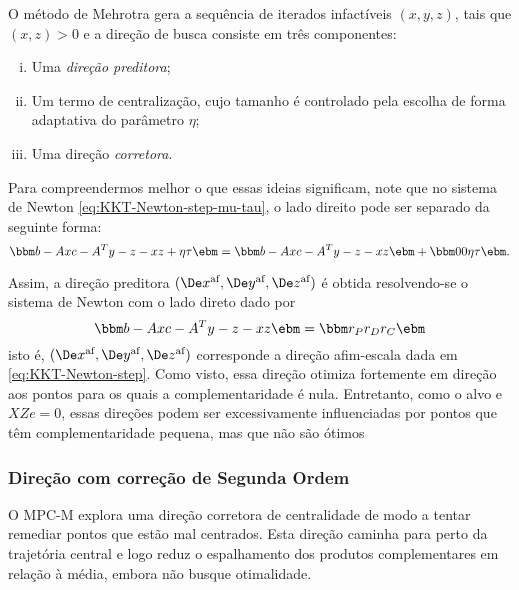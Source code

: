 O método de Mehrotra gera a sequência de iterados infactíveis
$(x,y,z)$, tais que $(x,z)>0$ e a direção de busca consiste em três componentes:
\begin{enumerate}[(i)]
  \item Uma  \emph{direção preditora}; 
  
  \item Um termo de centralização,
  cujo tamanho é controlado pela escolha de forma adaptativa do parâmetro $\eta$;
   \item Uma direção  \emph{corretora}.
\end{enumerate}




Para compreendermos melhor o que essas ideias significam, note que no sistema de
Newton \eqref{eq:KKT-Newton-step-mu-tau}, o lado direito pode ser separado da seguinte forma:
\[
\bbm b-Ax \\ c - A^Ty - z \\ -xz + \eta\tau \ebm = 
 \bbm b-Ax \\ c - A^Ty - z \\ -xz  \ebm +  \bbm 0 \\ 0 \\ 
 \eta\tau \ebm.
 \] 


Assim, a direção preditora $(\dex, \dey, \dez)$ é obtida resolvendo-se o
sistema de Newton com o lado direto dado por
 \begin{equation}
 \label{eq:afinne-scale-step}
 \bbm b-Ax\\ c - A^Ty - z \\ -xz  \ebm =  \bbm r_P\\ r_D \\ r_C  \ebm 
 \end{equation} 
 isto é,  $(\dex, \dey, \dez)$  corresponde a direção afim-escala dada em
\eqref{eq:KKT-Newton-step}. Como visto, essa direção otimiza fortemente em
direção aos pontos para os quais a complementaridade é nula. Entretanto, como o
alvo e $XZe = 0$, essas direções podem ser excessivamente influenciadas por
pontos que têm complementaridade pequena, mas que não são ótimos




\subsubsection{Direção com correção de Segunda Ordem}

O \ac{MPC-M} explora uma direção corretora de centralidade de modo a
tentar remediar pontos que estão mal centrados. Esta direção caminha para
perto da trajetória central e logo reduz o espalhamento dos produtos
complementares em relação à média, embora não busque otimalidade.

